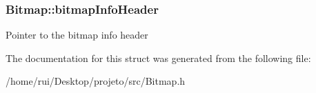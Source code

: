 \subsubsection[{\texorpdfstring{bitmap\+Info\+Header}{bitmapInfoHeader}}]{ Bitmap\+::bitmap\+Info\+Header}\hypertarget{structBitmap_a95c481a5ce1ff4af08cd135ca4af120b}{}\label{structBitmap_a95c481a5ce1ff4af08cd135ca4af120b}
Pointer to the bitmap info header 

The documentation for this struct was generated from the following file\+:\begin{DoxyCompactItemize}
\item 
/home/rui/\+Desktop/projeto/src/Bitmap.\+h\end{DoxyCompactItemize}
